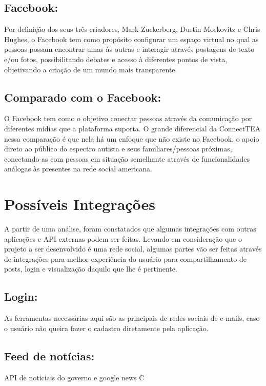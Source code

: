 \begin{apendicesenv}
\subsection{Facebook:}
Por definição dos seus três criadores, Mark Zuckerberg, Dustin Moskovitz e Chris Hughes, o Facebook tem como propósito configurar um espaço virtual no qual as pessoas possam encontrar umas às outras e interagir através postagens de texto e/ou fotos, possibilitando debates e acesso à diferentes pontos de vista, objetivando a criação de um mundo mais transparente.

\subsection{Comparado com o Facebook:}
O Facebook tem como o objetivo conectar pessoas através da comunicação por diferentes mídias que a plataforma suporta. O grande diferencial da ConnectTEA nessa comparação é que nela há um enfoque que não existe no Facebook, o apoio direto ao público do espectro autista e seus familiares/pessoas próximas, conectando-as com pessoas em situação semelhante através de funcionalidades análogas às presentes na rede social americana.





\section{Possíveis Integrações}
A partir de uma análise, foram constatados que algumas integrações com outras aplicações e API externas podem ser feitas. Levando em consideração que o projeto a ser desenvolvido é uma rede social, algumas partes vão ser feitas através de integrações para melhor experiência do usuário para compartilhamento de posts, login e visualização daquilo que lhe é pertinente. 

\subsection{Login:}
As ferramentas necessárias aqui são as principais de redes sociais de e-mails, caso o usuário não queira fazer o cadastro diretamente pela aplicação. 
\subsection{Feed de notícias:}
API de noticiais do governo e google news C

\end{apendicesenv}
